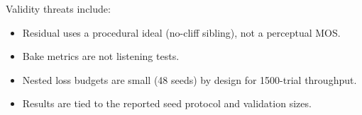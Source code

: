 Validity threats include:
\begin{itemize}
  \item Residual uses a procedural ideal (no-cliff sibling), not a perceptual MOS.
  \item Bake metrics are not listening tests.
  \item Nested loss budgets are small (48 seeds) by design for 1500-trial throughput.
  \item Results are tied to the reported seed protocol and validation sizes.
\end{itemize}
